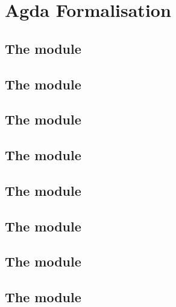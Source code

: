 \chapter{Agda Formalisation}\label{app:agda-form}

\section{The  module}

{
  \footnotesize
  
}

\section{The  module}

{
  \footnotesize
  
}

\section{The  module}

\footnotesize


\section{The  module}

{
  \footnotesize
  
}

\section{The  module}

{
  \footnotesize
  
}

\section{The  module}

{
  \footnotesize
  
}

\section{The  module}

{
  \footnotesize
  
}

\section{The  module}

{
  \footnotesize
  
}

